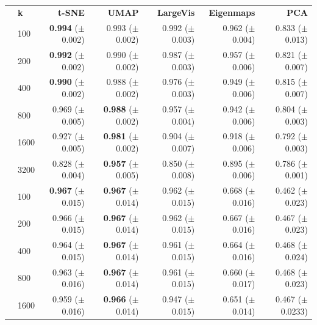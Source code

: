 \documentclass[12pt]{article}
\begin{document}
\begin{table}[!hptb]
\centering
\begin{tabular}{ll|rrrrr}
\toprule
\textbf{} & \textbf{k} & \textbf{t-SNE} & \textbf{UMAP} & \textbf{LargeVis} & \textbf{Eigenmaps} & \textbf{PCA} \\
\cline{2-7}
\parbox[t]{2mm}{}
&100	&\textbf{0.994}	{\tiny ($\pm$ 0.002)}&0.993	{\tiny ($\pm$ 0.002)}&0.992	{\tiny ($\pm$ 0.003)}&0.962	{\tiny ($\pm$ 0.004)}&0.833  {\tiny ($\pm$ 0.013)}\\
&200	&\textbf{0.992}	{\tiny ($\pm$ 0.002)}&0.990	{\tiny ($\pm$ 0.002)}&0.987	{\tiny ($\pm$ 0.003)}&0.957	{\tiny ($\pm$ 0.006)}&0.821  {\tiny ($\pm$ 0.007)}\\
&400	&\textbf{0.990}	{\tiny ($\pm$ 0.002)}&0.988	{\tiny ($\pm$ 0.002)}&0.976	{\tiny ($\pm$ 0.003)}&0.949	{\tiny ($\pm$ 0.006)}&0.815  {\tiny ($\pm$ 0.007)}\\
&800	&0.969	{\tiny ($\pm$ 0.005)}&\textbf{0.988}	{\tiny ($\pm$ 0.002)}&0.957	{\tiny ($\pm$ 0.004)}&0.942	{\tiny ($\pm$ 0.006)}&0.804  {\tiny ($\pm$ 0.003)}\\
&1600	&0.927	{\tiny ($\pm$ 0.005)}&\textbf{0.981}	{\tiny ($\pm$ 0.002)}&0.904	{\tiny ($\pm$ 0.007)}&0.918	{\tiny ($\pm$ 0.006)}&0.792  {\tiny ($\pm$ 0.003)}\\
&3200	&0.828	{\tiny ($\pm$ 0.004)}&\textbf{0.957}	{\tiny ($\pm$ 0.005)}&0.850	{\tiny ($\pm$ 0.008)}&0.895	{\tiny ($\pm$ 0.006)}&0.786  {\tiny ($\pm$ 0.001)}\\
\parbox[t]{2mm}{}
&100	&\textbf{0.967}	{\tiny ($\pm$ 0.015)}&\textbf{0.967}	{\tiny ($\pm$ 0.014)}&0.962	{\tiny ($\pm$ 0.015)}&0.668	{\tiny ($\pm$ 0.016)}&0.462  {\tiny ($\pm$ 0.023)}\\
&200	&0.966	{\tiny ($\pm$ 0.015)}&\textbf{0.967}	{\tiny ($\pm$ 0.014)}&0.962	{\tiny ($\pm$ 0.015)}&0.667	{\tiny ($\pm$ 0.016)}&0.467  {\tiny ($\pm$ 0.023)}\\
&400	&0.964	{\tiny ($\pm$ 0.015)}&\textbf{0.967}	{\tiny ($\pm$ 0.014)}&0.961	{\tiny ($\pm$ 0.015)}&0.664	{\tiny ($\pm$ 0.016)}&0.468  {\tiny ($\pm$ 0.024)}\\
&800	&0.963	{\tiny ($\pm$ 0.016)}&\textbf{0.967}	{\tiny ($\pm$ 0.014)}&0.961	{\tiny ($\pm$ 0.015)}&0.660	{\tiny ($\pm$ 0.017)}&0.468  {\tiny ($\pm$ 0.023)}\\
&1600	&0.959	{\tiny ($\pm$ 0.016)}&\textbf{0.966}	{\tiny ($\pm$ 0.014)}&0.947	{\tiny ($\pm$ 0.015)}&0.651	{\tiny ($\pm$ 0.014)}&0.467  {\tiny ($\pm$ 0.0233)}\\

\end{tabular}
\end{table}
\end{document}
